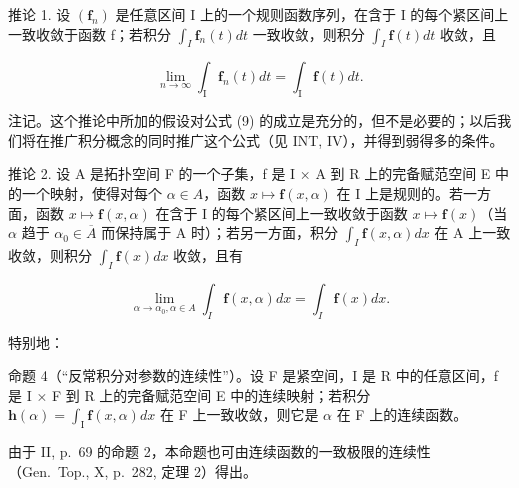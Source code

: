 推论 1. 设 \((\mathbf{f}_{n})\) 是任意区间 I 上的一个规则函数序列，在含于 I 的每个紧区间上一致收敛于函数 f；若积分 \(\int_{I} \mathbf{f}_{n}(t) dt\) 一致收敛，则积分 \(\int_{I} \mathbf{f}(t) dt\) 收敛，且

\[
\lim _ {n \to \infty} \int_ {\mathrm{I}} \mathbf {f} _ {n} (t) d t = \int_ {\mathrm{I}} \mathbf {f} (t) d t.\tag{9}
\]

注记。这个推论中所加的假设对公式 (9) 的成立是充分的，但不是必要的；以后我们将在推广积分概念的同时推广这个公式（见 INT, IV），并得到弱得多的条件。

推论 2. 设 A 是拓扑空间 F 的一个子集，f 是 I × A 到 R 上的完备赋范空间 E 中的一个映射，使得对每个 \(\alpha \in A\)，函数 \(x \mapsto \mathbf{f}(x, \alpha)\) 在 I 上是规则的。若一方面，函数 \(x \mapsto \mathbf{f}(x, \alpha)\) 在含于 I 的每个紧区间上一致收敛于函数 \(x \mapsto \mathbf{f}(x)\)（当 \(\alpha\) 趋于 \(\alpha_{0} \in \overline{A}\) 而保持属于 A 时）；若另一方面，积分 \(\int_{I} \mathbf{f}(x, \alpha) dx\) 在 A 上一致收敛，则积分 \(\int_{I} \mathbf{f}(x) dx\) 收敛，且有

\[
\lim _ {\alpha \rightarrow \alpha_ {0}, \alpha \in A} \int_ {I} \mathbf {f} (x, \alpha) d x = \int_ {I} \mathbf {f} (x) d x.\tag{10}
\]

特别地：

命题 4（“反常积分对参数的连续性”）。设 F 是紧空间，I 是 R 中的任意区间，f 是 I × F 到 R 上的完备赋范空间 E 中的连续映射；若积分 \(\mathbf{h}(\alpha) = \int_{\mathrm{I}} \mathbf{f}(x, \alpha) dx\) 在 F 上一致收敛，则它是 \(\alpha\) 在 F 上的连续函数。

由于 II, p.~69 的命题 2，本命题也可由连续函数的一致极限的连续性（Gen.~Top., X, p.~282, 定理 2）得出。

